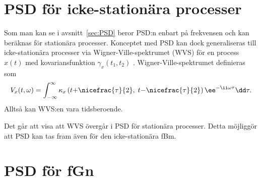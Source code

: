 \section{PSD för icke-stationära processer}
Som man kan se i avsnitt~\ref{sec:PSD} beror PSD:n enbart på frekvensen och kan beräknas för stationära processer. Konceptet med PSD kan dock generaliseras till icke-stationära processer via Wigner-Ville-spektrumet (WVS) för en process $x(t)$ med kovariansfunktion $\gamma_x(t_1,t_2)$ \cite{Flandrin_fBmspektrum1989}. Wigner-Ville-spektrumet definieras som
\begin{equation} \label{eq:WVS}
V_x(t,\omega)=
\int^{\infty}_{-\infty} 
\kappa_x\left(t{+}\nicefrac{\tau}{2},\; t{-}\nicefrac{\tau}{2}\right) \ee^{-\ii \omega \tau} \dd\tau.
\end{equation}
Alltså kan WVS:en vara tidsberoende. 

Det går att visa att WVS övergår i PSD för stationära processer. Detta möjliggör att PSD kan tas fram även för den icke-stationära fBm.


\section{PSD för fGn}
\label{sec:PSD_fGn}

